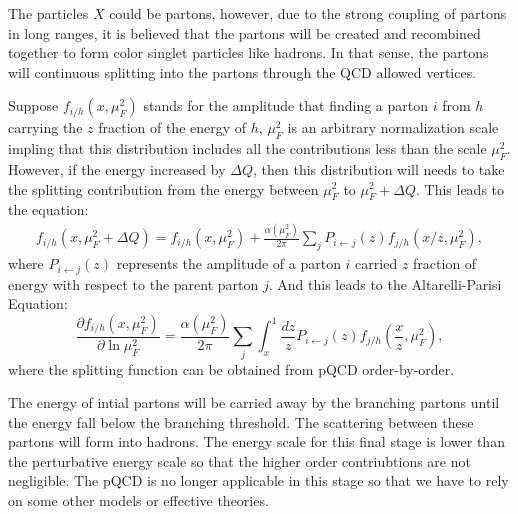 The particles $X$ could be partons, however, due to the strong coupling of partons in long ranges, it is believed that the partons will be created and recombined together to form color singlet particles like hadrons. In that sense, the partons will continuous splitting into the partons through the QCD allowed vertices.


Suppose $f_{i/h}(x,\mu^2_F)$ stands for the amplitude that finding a parton $i$ from $h$ carrying the $z$ fraction of the energy of $h$, $\mu^2_F$ is an arbitrary normalization scale impling that this distribution includes all the contributions less than the scale $\mu^2_F$. However, if the energy increased by $\Delta Q$, then this distribution will needs to take the splitting contribution from the energy between $\mu^2_F$ to $\mu^2_F+\Delta Q$. This leads to the equation:
\begin{equation}
	\begin{aligned}
		f_{i/h}(x,\mu^2_F+\Delta Q)= f_{i/h}(x,\mu^2_F)+ \frac{\alpha(\mu^2_F)}{2\pi}\sum_jP_{i\leftarrow j}(z)f_{j/h}(x/z,\mu^2_F),
	\end{aligned}
\end{equation}
where $P_{i\leftarrow j}(z)$ represents the amplitude of a parton $i$ carried $z$ fraction of energy with respect to the parent parton $j$. And this leads to the Altarelli-Parisi Equation:
\begin{equation}\label{eq:DGLAP}
	\frac{\partial f_{i/h}(x,\mu^2_F)}{\partial \ln\mu^2_F} = \frac{\alpha(\mu^2_F)}{2\pi}\sum_j\int_x^1\frac{dz}{z}P_{i\leftarrow j}(z)f_{j/h}(\frac{x}{z}, \mu^2_F),
\end{equation}
where the splitting function can be obtained from pQCD order-by-order.

The energy of intial partons will be carried away by the branching partons until the energy fall below the branching threshold. The scattering between these partons will form into hadrons. The energy scale for this final stage is lower than the perturbative energy scale so that the higher order contriubtions are not negligible. The pQCD is no longer applicable in this stage so that we have to rely on some other models or effective theories.

